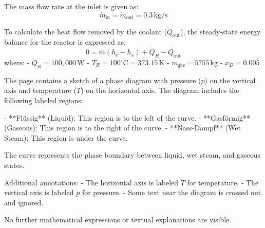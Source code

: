 The mass flow rate at the inlet is given as:  
\[
\dot{m}_{\text{in}} = \dot{m}_{\text{out}} = 0.3 \, \text{kg/s}
\]

To calculate the heat flow removed by the coolant (\( \dot{Q}_{\text{out}} \)), the steady-state energy balance for the reactor is expressed as:  
\[
0 = \dot{m} \left( h_{\text{e}} - h_{\text{a}} \right) + \dot{Q}_R - \dot{Q}_{\text{out}}
\]
where:  
- \( \dot{Q}_R = 100,000 \, \text{W} \)  
- \( T_R = 100^\circ\text{C} = 373.15 \, \text{K} \)  
- \( m_{\text{ges}} = 5755 \, \text{kg} \)  
- \( x_D = 0.005 \)

The page contains a sketch of a phase diagram with pressure (\( p \)) on the vertical axis and temperature (\( T \)) on the horizontal axis. The diagram includes the following labeled regions:  

- **Flüssig** (Liquid): This region is to the left of the curve.  
- **Gasförmig** (Gaseous): This region is to the right of the curve.  
- **Nass-Dampf** (Wet Steam): This region is under the curve.  

The curve represents the phase boundary between liquid, wet steam, and gaseous states.  

Additional annotations:  
- The horizontal axis is labeled \( T \) for temperature.  
- The vertical axis is labeled \( p \) for pressure.  
- Some text near the diagram is crossed out and ignored.  

No further mathematical expressions or textual explanations are visible.